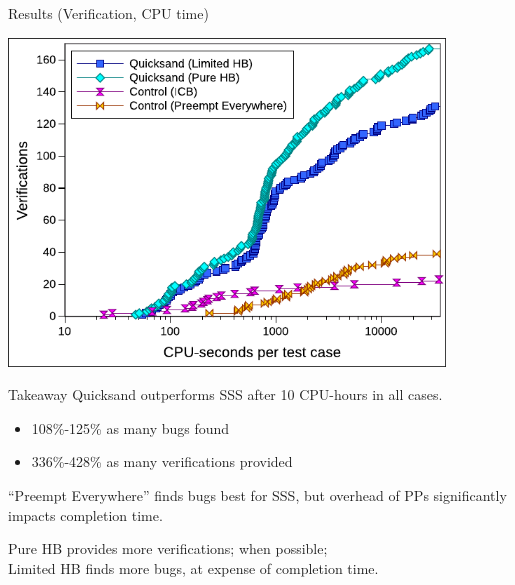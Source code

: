\documentclass[xcolor=dvipsnames]{beamer}
\begin{document}
\begin{frame}{Results (Verification, CPU time)}
	\begin{center}
	\vspace{-0.8em}
	\includegraphics[width=0.87\textwidth]{verifs-talk.pdf}
	\end{center}
\end{frame}

\begin{frame}{Takeaway}
	Quicksand outperforms SSS after 10 CPU-hours in all cases.
	\begin{itemize}
		\item 108\%-125\% as many bugs found
		\item 336\%-428\% as many verifications provided
	\end{itemize}
	\linegap

	``Preempt Everywhere'' finds bugs best for SSS, but overhead of PPs significantly impacts completion time.
	\linegap

	Pure HB provides more verifications; when possible; \\
	Limited HB finds more bugs, at expense of completion time.
\end{frame}





\end{document}
